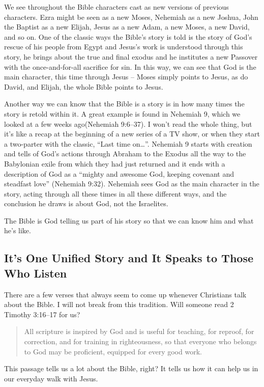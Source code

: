 We see throughout the Bible characters cast as new versions of previous
characters. Ezra might be seen as a new Moses, Nehemiah as a new Joshua, John
the Baptist as a new Elijah, Jesus as a new Adam, a new Moses, a new David, and
so on. One of the classic ways the Bible's story is told is the story of God's
rescue of his people from Egypt and Jesus's work is understood through this
story, he brings about the true and final exodus and he institutes a new
Passover with the once-and-for-all sacrifice for sin. In this way, we can see
that God is the main character, this time through Jesus -- Moses simply points
to Jesus, as do David, and Elijah, the whole Bible points to Jesus.

Another way we can know that the Bible is a story is in how many times the story
is retold within it. A great example is found in Nehemiah 9, which we looked at
a few weeks ago(Nehemiah 9:6--37). I won't read the whole thing, but it's like a
recap at the beginning of a new series of a TV show, or when they start a
two-parter with the classic, \enquote{Last time on\dots}. Nehemiah 9 starts with
creation and tells of God's actions through Abraham to the Exodus all the way to
the Babylonian exile from which they had just returned and it ends with a
description of God as a \enquote{mighty and awesome God, keeping covenant and
steadfast love} (Nehemiah 9:32). Nehemiah sees God as the main character in the
story, acting through all these times in all these different ways, and the
conclusion he draws is about God, not the Israelites.

The Bible is God telling us part of his story so that we can know him and what
he's like.

\subsection{It's One Unified Story and It Speaks to Those Who Listen}

There are a few verses that always seem to come up whenever Christians talk
about the Bible. I will not break from this tradition. Will someone read 2
Timothy 3:16--17 for us?

\begin{quote}
    All scripture is inspired by God and is useful for teaching, for reproof,
    for correction, and for training in righteousness, so that everyone who
    belongs to God may be proficient, equipped for every good work.
\end{quote}

This passage tells us a lot about the Bible, right? It tells us how it can help
us in our everyday walk with Jesus.

